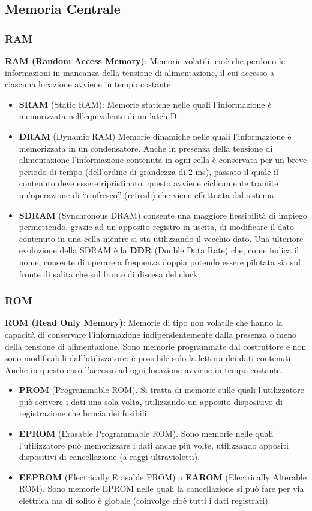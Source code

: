 \documentclass[12pt]{article}
\begin{document}
\subsection{Memoria Centrale}
\subsubsection{RAM}
\textbf{RAM (Random Access Memory)}: Memorie volatili, cioè che perdono le informazioni in mancanza della tensione di alimentazione, il cui accesso a ciascuna locazione avviene in tempo costante.
\begin{itemize}
    \item \textbf{SRAM} (Static RAM): Memorie statiche nelle quali l’informazione è memorizzata nell’equivalente di un latch D.
    \item  \textbf{DRAM} (Dynamic RAM) Memorie dinamiche nelle quali l’informazione è memorizzata in un condensatore. Anche in presenza della tensione di alimentazione l’informazione contenuta in ogni cella è conservata per un breve periodo di tempo (dell’ordine di grandezza di 2 ms), passato il quale il contenuto deve essere ripristinato: questo avviene ciclicamente tramite un’operazione di “rinfresco” (refresh) che viene effettuata dal sistema.
    \item \textbf{SDRAM} (Synchronous DRAM) consente una maggiore flessibilità di impiego permettendo, grazie ad un apposito registro in uscita, di modificare il dato contenuto in una cella mentre si sta utilizzando il vecchio dato. Una ulteriore evoluzione della SDRAM è la \textbf{DDR} (Double Data Rate) che, come indica il nome, consente di operare a frequenza doppia potendo essere pilotata sia sul fronte di salita che sul fronte di discesa del clock.
\end{itemize}

\subsubsection{ROM}
\textbf{ROM (Read Only Memory)}: Memorie di tipo non volatile che hanno la capacità di conservare l’informazione indipendentemente dalla presenza o meno della tensione di alimentazione. Sono memorie programmate dal costruttore e non sono modificabili dall’utilizzatore: è possibile solo la lettura dei dati contenuti. Anche in questo caso l’accesso ad ogni locazione avviene in tempo costante.
\begin{itemize}
    \item  \textbf{PROM} (Programmable ROM). Si tratta di memorie sulle quali l’utilizzatore può scrivere i dati una sola volta, utilizzando un apposito dispositivo di registrazione che brucia dei fusibili.
    \item \textbf{EPROM} (Erasable Programmable ROM). Sono memorie nelle quali l’utilizzatore può memorizzare i dati anche più volte, utilizzando appositi dispositivi di cancellazione (a raggi ultravioletti).
    \item \textbf{EEPROM} (Electrically Erasable PROM) o \textbf{EAROM} (Electrically Alterable ROM). Sono memorie EPROM nelle quali la cancellazione si può fare per via elettrica ma di solito è globale (coinvolge cioè tutti i dati registrati).\par\medskip\noindent
\end{itemize}
\end{document}
